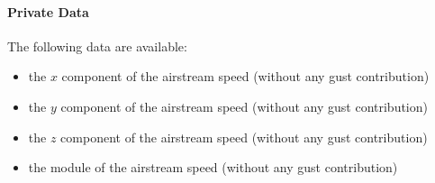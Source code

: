 \paragraph{Private Data}
The following data are available:
\begin{itemize}
\item {} the $x$ component of the airstream speed (without any gust contribution)
\item {} the $y$ component of the airstream speed (without any gust contribution)
\item {} the $z$ component of the airstream speed (without any gust contribution)
\item {} the module of the airstream speed (without any gust contribution)
\end{itemize}



